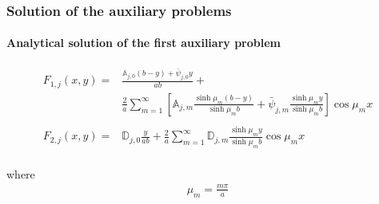 \documentclass{beamer}
\begin{document}
%					
%					
%					
%					
%
\begin{frame}
	\frametitle{Solution of the auxiliary problems}
	\framesubtitle{Analytical solution of the first auxiliary problem}
	
	\begin{alertblock}{}
		\begin{align*}
		F_{1, j}(x, y) = & \frac{\mathbb{A}_{j,0}(b - y) + \bar{\psi}_{j,0}y}{ab} + \nonumber \\
		&\frac{2}{a}\sum_{m=1}^\infty\left[\mathbb{A}_{j,m}\frac{\sinh\mu_m (b - y)}{\sinh\mu_m b} + \bar{\psi}_{j, m}\frac{\sinh\mu_m y}{\sinh\mu_m b}\right]\cos\mu_m x \\ \\
		F_{2, j}(x, y) = & \mathbb{D}_{j,0}\frac{y}{ab}  + \frac{2}{a}\sum_{m=1}^\infty\mathbb{D}_{j,m}\frac{\sinh\mu_m y}{\sinh\mu_m b} \cos\mu_m x \\
		\end{align*}
	\end{alertblock}	
	
	where
	\begin{align*}
	\mu_m = \frac{m \pi}{a}
	\end{align*}
	
\end{frame}
\end{document}
